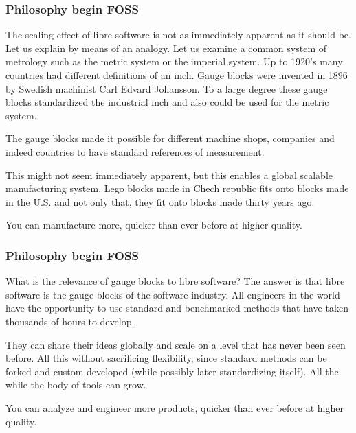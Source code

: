 \documentclass{beamer}
\begin{document}

\begin{frame}
\frametitle{Philosophy begin FOSS}

The scaling effect of libre software is not as immediately apparent as it should be.  Let us explain by means of an analogy.
Let us examine a common system of metrology such as the metric system or the imperial system.
Up to 1920's many countries had different definitions of an inch.
Gauge blocks were invented in 1896 by Swedish machinist Carl Edvard Johansson.
To a large degree these gauge blocks standardized the industrial inch and also could be used for the metric system.

The gauge blocks made it possible for different machine shops, companies and indeed countries to have standard references of measurement.

This might not seem immediately apparent, but this enables a global scalable manufacturing system.  Lego blocks made in Chech republic fits onto blocks made in the U.S. and not only that, they fit onto blocks made thirty years ago.

You can manufacture more, quicker than ever before at higher quality.

\end{frame}



\begin{frame}
\frametitle{Philosophy begin FOSS}

What is the relevance of gauge blocks to libre software?
The answer is that libre software is the gauge blocks of the software industry.
All engineers in the world have the opportunity to use standard and benchmarked methods that have taken thousands of hours to develop.

They can share their ideas globally and scale on a level that has never been seen before.
All this without sacrificing flexibility, since standard methods can be forked and custom developed (while possibly later standardizing itself).  All the while the body of tools can grow.

You can analyze and engineer more products, quicker than ever before at higher quality.

\end{frame}
\end{document}
